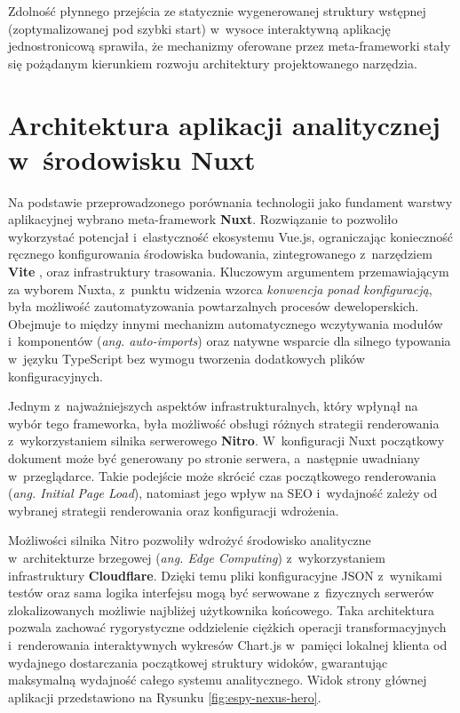 Zdolność płynnego przejścia ze statycznie wygenerowanej struktury wstępnej (zoptymalizowanej pod szybki start) w~wysoce interaktywną aplikację jednostronicową sprawiła, że mechanizmy oferowane przez meta-frameworki stały się pożądanym kierunkiem rozwoju architektury projektowanego narzędzia.

\section{Architektura aplikacji analitycznej w~środowisku Nuxt}
\label{sec:architektura-aplikacji-analitycznej-w-srodowisku-nuxt}

Na podstawie przeprowadzonego porównania technologii jako fundament warstwy aplikacyjnej wybrano meta-framework \textbf{Nuxt}.
Rozwiązanie to pozwoliło wykorzystać potencjał i~elastyczność ekosystemu Vue.js, ograniczając konieczność ręcznego konfigurowania środowiska budowania, zintegrowanego z~narzędziem \textbf{Vite} \cite{vite_guide}, oraz infrastruktury trasowania.
Kluczowym argumentem przemawiającym za wyborem Nuxta, z~punktu widzenia wzorca \textit{konwencja ponad konfiguracją}, była możliwość zautomatyzowania powtarzalnych procesów deweloperskich.
Obejmuje to między innymi mechanizm automatycznego wczytywania modułów i~komponentów (\textit{ang. auto-imports}) oraz natywne wsparcie dla silnego typowania w~języku TypeScript bez wymogu tworzenia dodatkowych plików konfiguracyjnych.

Jednym z~najważniejszych aspektów infrastrukturalnych, który wpłynął na wybór tego frameworka, była możliwość obsługi różnych strategii renderowania z~wykorzystaniem silnika serwerowego \textbf{Nitro}.
W~konfiguracji Nuxt początkowy dokument może być generowany po stronie serwera, a~następnie uwadniany w~przeglądarce.
Takie podejście może skrócić czas początkowego renderowania (\textit{ang. Initial Page Load}), natomiast jego wpływ na SEO i~wydajność zależy od wybranej strategii renderowania oraz konfiguracji wdrożenia.

Możliwości silnika Nitro pozwoliły wdrożyć środowisko analityczne w~architekturze brzegowej (\textit{ang. Edge Computing}) z~wykorzystaniem infrastruktury \textbf{Cloudflare}.
Dzięki temu pliki konfiguracyjne JSON z~wynikami testów oraz sama logika interfejsu mogą być serwowane z~fizycznych serwerów zlokalizowanych możliwie najbliżej użytkownika końcowego.
Taka architektura pozwala zachować rygorystyczne oddzielenie ciężkich operacji transformacyjnych i~renderowania interaktywnych wykresów Chart.js w~pamięci lokalnej klienta od wydajnego dostarczania początkowej struktury widoków, gwarantując maksymalną wydajność całego systemu analitycznego.
Widok strony głównej aplikacji przedstawiono na Rysunku \ref{fig:espy-nexus-hero}.


